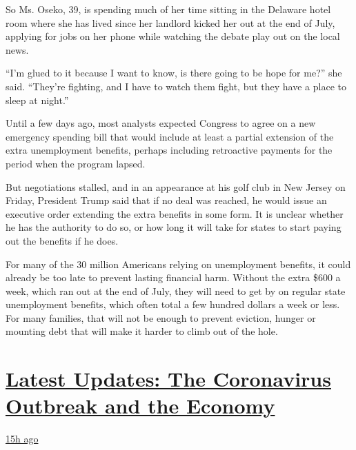 So Ms. Oseko, 39, is spending much of her time sitting in the Delaware
hotel room where she has lived since her landlord kicked her out at the
end of July, applying for jobs on her phone while watching the debate
play out on the local news.

``I'm glued to it because I want to know, is there going to be hope for
me?'' she said. ``They're fighting, and I have to watch them fight, but
they have a place to sleep at night.''

Until a few days ago, most analysts expected Congress to agree on a new
emergency spending bill that would include at least a partial extension
of the extra unemployment benefits, perhaps including retroactive
payments for the period when the program lapsed.

But negotiations stalled, and in an appearance at his golf club in New
Jersey on Friday, President Trump said that if no deal was reached, he
would issue an executive order extending the extra benefits in some
form. It is unclear whether he has the authority to do so, or how long
it will take for states to start paying out the benefits if he does.

For many of the 30 million Americans relying on unemployment benefits,
it could already be too late to prevent lasting financial harm. Without
the extra \$600 a week, which ran out at the end of July, they will need
to get by on regular state unemployment benefits, which often total a
few hundred dollars a week or less. For many families, that will not be
enough to prevent eviction, hunger or mounting debt that will make it
harder to climb out of the hole.

\hypertarget{latest-updates-the-coronavirus-outbreak-and-the-economy}{%
\section{\texorpdfstring{\href{https://www.nytimes.com/live/2020/08/07/business/stock-market-today-coronavirus?action=click\&pgtype=Article\&state=default\&region=MAIN_CONTENT_1\&context=storylines_live_updates}{Latest
Updates: The Coronavirus Outbreak and the
Economy}}{Latest Updates: The Coronavirus Outbreak and the Economy}}\label{latest-updates-the-coronavirus-outbreak-and-the-economy}}

\href{https://www.nytimes.com/live/2020/08/07/business/stock-market-today-coronavirus?action=click\&pgtype=Article\&state=default\&region=MAIN_CONTENT_1\&context=storylines_live_updates\#wealthy-families-are-throwing-a-lifeline-to-distressed-businesses}{15h
ago}

